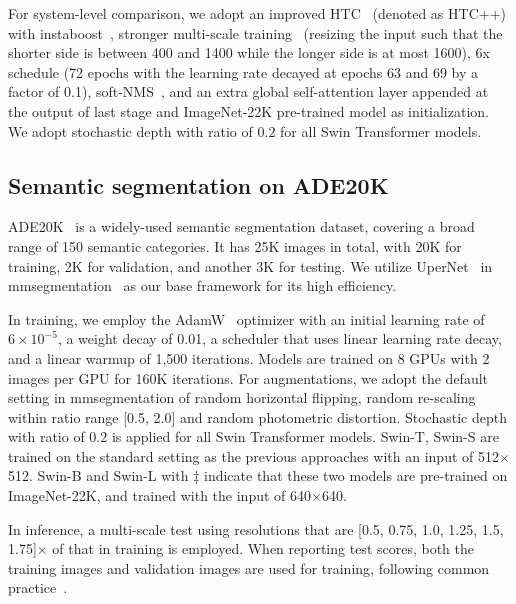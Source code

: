 \documentclass[10pt,twocolumn,letterpaper]{article}
\begin{document}
For system-level comparison, we adopt an improved HTC~\cite{chen2019htc} (denoted as HTC++) with instaboost~\cite{fang2019instaboost}, stronger multi-scale training~\cite{cao2019gcnet} (resizing the input such that the shorter side is between 400 and 1400 while the longer side is at most 1600), 6x schedule (72 epochs with the learning rate decayed at epochs 63 and 69 by a factor of 0.1), soft-NMS~\cite{Bodla2017softnms}, and an extra global self-attention layer appended at the output of last stage and ImageNet-22K pre-trained model as initialization. We adopt stochastic depth with ratio of $0.2$ for all Swin Transformer models.

\subsection{Semantic segmentation on ADE20K}

ADE20K~\cite{zhou2018semantic} is a widely-used semantic segmentation dataset, covering a broad range of 150 semantic categories. It has 25K images in total, with 20K for training, 2K for validation, and another 3K for testing. We utilize UperNet~\cite{xiao2018upernet} in mmsegmentation~\cite{mmseg2020} as our base framework for its high efficiency. 

In training, we employ the AdamW~\cite{loshchilov2017decoupled} optimizer with an initial learning rate of $6\times10^{-5}$, a weight decay of 0.01, a scheduler that uses linear learning rate decay, and a linear warmup of 1,500 iterations. Models are trained on 8 GPUs with 2 images per GPU for 160K iterations. For augmentations, we adopt the default setting in mmsegmentation of random horizontal flipping, random re-scaling within ratio range [0.5, 2.0] and random photometric distortion. Stochastic depth with ratio of $0.2$ is applied for all Swin Transformer models.
Swin-T, Swin-S are trained on the standard setting as the previous approaches with an input of 512$\times$512. Swin-B and Swin-L with $\ddag$ indicate that these two models are pre-trained on ImageNet-22K, and trained with the input of 640$\times$640.

In inference, a multi-scale test using resolutions that are [0.5, 0.75, 1.0, 1.25, 1.5, 1.75]$\times$ of that in training is employed. When reporting test scores, both the training images and validation images are used for training, following common practice~\cite{yin2020DNL}.
\end{document}
